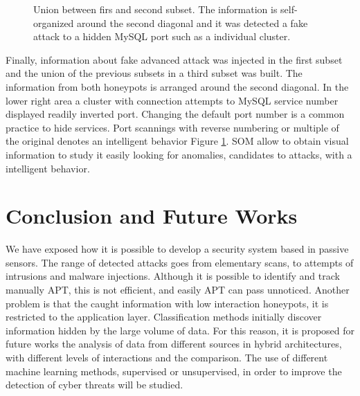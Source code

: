 \documentclass[a4paper]{llncs}
\begin{document}
\begin{figure}[h]
	\caption{Union between firs and second subset. The information is self-organized around the second diagonal and it was detected a fake attack to a hidden MySQL port such as a individual cluster.\label{fig:SOMsubset3}}
\end{figure}

Finally, information about fake advanced attack was injected in the first subset and the union of the previous subsets in a third subset was built. The information from both honeypots is arranged around the second diagonal. In the lower right area a cluster with connection attempts to MySQL service number displayed readily inverted port. Changing the default port number is a common practice to hide services. Port scannings with reverse numbering or multiple of the original denotes an intelligent behavior Figure \ref{fig:SOMsubset3}. SOM allow to obtain visual information to study it easily looking for  anomalies, candidates to attacks, with a intelligent behavior.

\section{Conclusion and Future Works}
\label{sec:conclusion&future}
We have exposed how it is possible to develop a security system based in passive sensors. The range of detected attacks goes from elementary scans, to attempts of intrusions and malware injections. Although it is possible to identify and track manually APT, this is not efficient, and easily APT can pass unnoticed. Another problem is that the caught information with low interaction honeypots, it is restricted to the application layer. Classification methods initially discover information hidden by the large volume of data. 
For this reason, it is proposed for future works the analysis of data from different sources in hybrid architectures, with different levels of interactions and the comparison. The use of different machine learning methods, supervised or unsupervised, in order to improve the detection of cyber threats will be studied.



\end{document}
